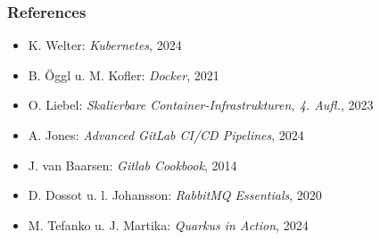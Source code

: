\begin{frame}[allowframebreaks]
	\frametitle{References}
	\begin{itemize}
		\item K. Welter: \textit{Kubernetes}, 2024
		\item B. Öggl u. M. Kofler: \textit{Docker}, 2021
		\item O. Liebel: \textit{Skalierbare Container-Infrastrukturen, 4. Aufl.}, 2023
		\item A. Jones: \textit{Advanced GitLab CI/CD Pipelines}, 2024
		\item J. van Baarsen: \textit{Gitlab Cookbook}, 2014
		\item D. Dossot u. l. Johansson: \textit{RabbitMQ Essentials}, 2020
		\item M. Tefanko u. J. Martika: \textit{Quarkus in Action}, 2024
	\end{itemize}
	\nocite{*}
\end{frame}